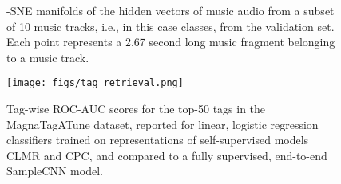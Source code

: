 \documentclass{article}
\begin{document}
\begin{figure}[h]
    \centering
    \hfill
    \hfill
    \caption{-SNE manifolds of the hidden vectors of music audio from a subset of 10 music tracks, i.e., in this case classes, from the validation set. Each point represents a 2.67 second long music fragment belonging to a music track.}
    \label{fig:tsne}
\end{figure}


\begin{figure*}[h]
    \centering
    \texttt{[image: figs/tag\_retrieval.png]}
    \caption{Tag-wise ROC-AUC scores for the top-50 tags in the Magna\-Tag\-A\-Tune dataset, reported for linear, logistic regression classifiers trained on representations of self-supervised models CLMR and CPC, and compared to a fully supervised, end-to-end SampleCNN model.}
    \label{fig:tag_scores}
\end{figure*}
\end{document}
